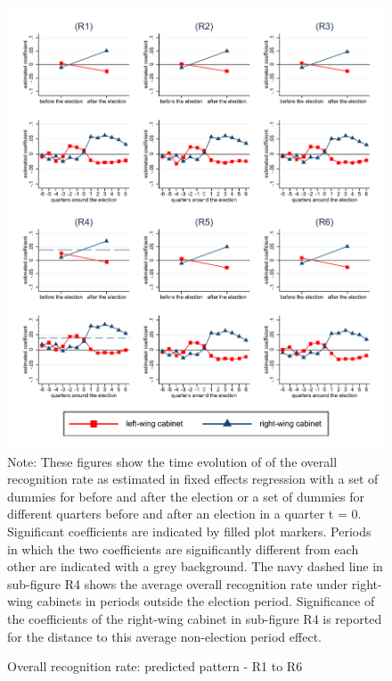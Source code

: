 \documentclass[11pt,a4paper]{scrartcl}
\begin{document}
\clearpage
\FloatBarrier
\begin{figure}[!ht]
	\caption{Overall recognition rate: predicted pattern - R1 to R6}
	\includegraphics[width=1\textwidth]{../results/decisions/acceptance_rate_graphs_R1-R6.pdf}
	\scriptsize{Note: These figures show the time evolution of of the overall recognition rate as estimated in fixed effects regression with a set of dummies for before and after the election or a set of dummies for different quarters before and after an election in a quarter t = 0. Significant coefficients are indicated by filled plot markers. Periods in which the two coefficients are significantly different from each other are indicated with a grey background. The navy dashed line in sub-figure R4 shows the average overall recognition rate under right-wing cabinets in periods outside the election period. Significance of the coefficients of the right-wing cabinet in sub-figure R4 is reported for the distance to this average non-election period effect.}
\end{figure}

\clearpage
\FloatBarrier


\end{document}
